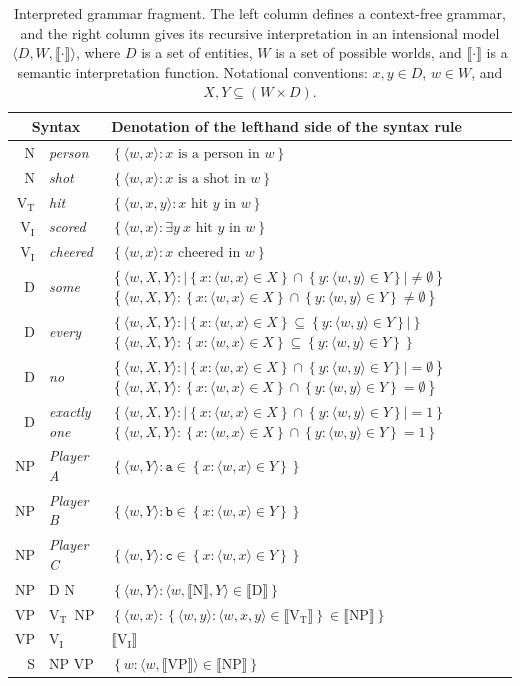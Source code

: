 \documentclass[leqno,12pt]{article}
\newcommand{\word}[1]{\emph{#1}}
\newcommand{\set}[1]{\ensuremath{\left\{ #1 \right\}}}
\newcommand{\tuple}[1]{\langle #1 \rangle}
\newcommand{\sem}[1]{\ensuremath{\llbracket#1\rrbracket}}
\newcommand{\Worlds}{W}
\newcommand{\Domain}{D}
\newcommand{\playera}{\texttt{a}}
\newcommand{\playerb}{\texttt{b}}
\newcommand{\playerc}{\texttt{c}}
\newcommand{\Vt}{V$_{\text{T}}$}
\newcommand{\Vi}{V$_{\text{I}}$}
\newcommand{\gsem}[1]{\sem{\text{#1}}}
\newcommand{\genericquantifier}[3][]{%
  \ifthenelse{\equal{#1}{cardinality}}%
  {$\set{\tuple{w, X, Y} : |\set{x : \tuple{w,x} \in X} #2 \set{y : \tuple{w,y} \in Y}| #3}$}
  {$\set{\tuple{w, X, Y} :  \set{x : \tuple{w,x} \in X} #2 \set{y : \tuple{w,y} \in Y}  #3}$}}
\newcommand{\genericpn}[1]{\set{\tuple{w, Y} : #1 \in \set{x : \tuple{w,x} \in Y}}}
\begin{document}
{\begin{table}[t]
  \centering
  \renewcommand{\arraystretch}{1.2}
  \begin{tabular}[c]{r@{ $\rightarrow$ }l l}
    \toprule
    \multicolumn{2}{c}{Syntax}     & Denotation of the lefthand side of the syntax rule\\
    \midrule
    N   & \word{person}      & $\set{\tuple{w, x} : x \text{ is a person in } w}$ \\
    N   & \word{shot}        & $\set{\tuple{w, x} : x \text{ is a shot in } w}$ \\
    \Vt & \word{hit}         & $\set{\tuple{w, x, y} : x \text{ hit } y \text{ in } w}$ \\
    \Vi & \word{scored}      & $\set{\tuple{w, x} : \exists y \ x \text{ hit } y \text{ in } w}$ \\
    \Vi & \word{cheered}     & $\set{\tuple{w, x} : x \text{ cheered in } w}$ \\
    D   & \word{some}        & \genericquantifier{\cap}{\neq \emptyset} \\
    D   & \word{every}       & \genericquantifier{\subseteq}{} \\
    D   & \word{no}          & \genericquantifier{\cap}{= \emptyset} \\
    D   & \word{exactly one} & \genericquantifier[cardinality]{\cap}{= 1} \\
    NP  & \word{Player A}     & \genericpn{\playera} \\
    NP  & \word{Player B}     & \genericpn{\playerb} \\
    NP  & \word{Player C}     & \genericpn{\playerc} 
    \\[1ex]    
    NP  & D N         & $\set{\tuple{w, Y} : \tuple{w, \gsem{N}, Y} \in \gsem{D}}$ \\
    VP  & \Vt\ NP     & $\set{\tuple{w, x} :  \set{\tuple{w, y} :  \tuple{w, x, y} \in \gsem{\Vt}} \in \gsem{NP}}$ \\
    VP  & \Vi         & $\gsem{\Vi}$ \\
    S   & NP VP       & $\set{w : \tuple{w, \gsem{VP}} \in \gsem{NP}}$ \\
    \bottomrule
  \end{tabular}
  \caption{Interpreted grammar fragment. The left column defines a context-free grammar,
    and the right column gives its recursive interpretation in an intensional model
    $\tuple{\Domain, \Worlds, \sem{\cdot}}$, where $\Domain$ is a set of entities,
    $\Worlds$ is a set of possible worlds, and $\sem{\cdot}$ is a semantic interpretation
    function. Notational conventions: $x, y \in \Domain$, $w \in \Worlds$, and $X, Y \subseteq (\Worlds \times \Domain)$.}
  \label{tab:grammar}
\end{table}



}
\end{document}
